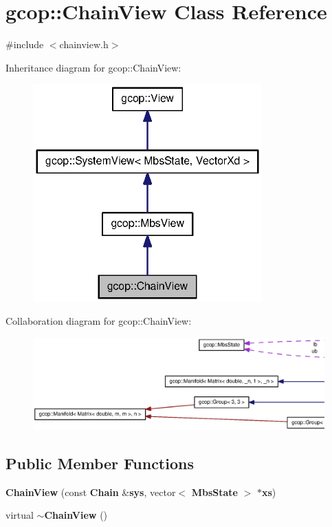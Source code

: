 \section{gcop\-:\-:\-Chain\-View \-Class \-Reference}
\label{classgcop_1_1ChainView}


{\ttfamily \#include $<$chainview.\-h$>$}



\-Inheritance diagram for gcop\-:\-:\-Chain\-View\-:
\nopagebreak
\begin{figure}[H]
\begin{center}
\leavevmode
\includegraphics[width=250pt]{classgcop_1_1ChainView__inherit__graph}
\end{center}
\end{figure}


\-Collaboration diagram for gcop\-:\-:\-Chain\-View\-:
\nopagebreak
\begin{figure}[H]
\begin{center}
\leavevmode
\includegraphics[width=350pt]{classgcop_1_1ChainView__coll__graph}
\end{center}
\end{figure}
\subsection*{\-Public \-Member \-Functions}
\begin{DoxyCompactItemize}
\item 
{\bf \-Chain\-View} (const {\bf \-Chain} \&{\bf sys}, vector$<$ {\bf \-Mbs\-State} $>$ $\ast${\bf xs})
\item 
virtual {\bf $\sim$\-Chain\-View} ()
\end{DoxyCompactItemize}
